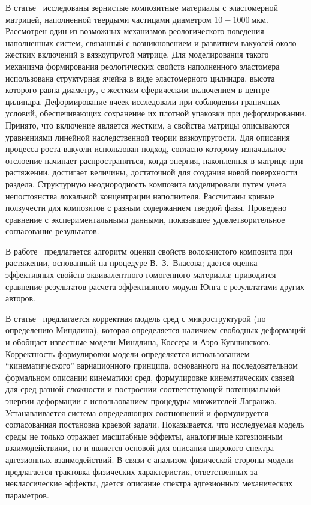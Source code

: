 В статье~\cite{Golotina} исследованы зернистые композитные материалы с эластомерной матрицей, наполненной твердыми частицами диаметром $10-1000~\text{мкм}$. Рассмотрен один из возможных механизмов реологического поведения наполненных систем, связанный с возникновением и развитием вакуолей около жестких включений в вязкоупругой матрице. Для моделирования такого механизма формирования реологических свойств наполненного эластомера использована структурная ячейка в виде эластомерного цилиндра, высота которого равна диаметру, с жестким сферическим включением в центре цилиндра. Деформирование ячеек исследовали при соблюдении граничных условий, обеспечивающих сохранение их плотной упаковки при деформировании. Принято, что включение является жестким, а свойства матрицы описываются уравнениями линейной наследственной теории вязкоупругости. Для описания процесса роста вакуоли использован подход, согласно которому изначальное отслоение начинает распространяться, когда энергия, накопленная в матрице при растяжении, достигает величины, достаточной для создания новой поверхности раздела. Структурную неоднородность композита моделировали путем учета непостоянства локальной концентрации наполнителя. Рассчитаны кривые ползучести для композитов с разным содержанием твердой фазы. Проведено сравнение с экспериментальными данными, показавшее удовлетворительное согласование результатов.{\sloppy\par}

В работе~\cite{Gordeev} предлагается алгоритм оценки свойств волокнистого композита при растяжении, основанный на процедуре В.~З.~Власова; дается оценка эффективных свойств эквивалентного гомогенного материала; приводится сравнение результатов расчета эффективного модуля Юнга с результатами других авторов.

В статье~\cite{Belov} предлагается корректная модель сред с микроструктурой (по определению Миндлина), которая определяется наличием свободных деформаций и обобщает известные модели Миндлина, Коссера и Аэро-Кувшинского. Корректность формулировки модели определяется использованием ``кинематического'' вариационного принципа, основанного на последовательном формальном описании кинематики сред, формулировке кинематических связей для сред разной сложности и построении соответствующей потенциальной энергии деформации с использованием процедуры множителей Лагранжа. Ус\-та\-нав\-ли\-ва\-ет\-ся система определяющих соотношений и формулируется согласованная постановка краевой задачи. Показывается, что исследуемая модель среды не только отражает масштабные эффекты, аналогичные когезионным взаимодействиям, но и является основой для описания широкого спектра адгезионных взаимодействий. В связи с анализом физической стороны модели предлагается трактовка физических характеристик, ответственных за неклассические эффекты, дается описание спектра адгезионных механических параметров.

